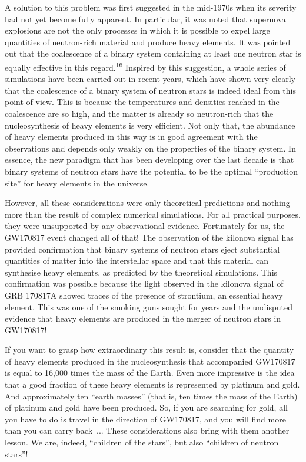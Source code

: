 A solution to this problem was first suggested in the mid-1970s when its severity had
not yet become fully apparent. In particular, it was noted that supernova explosions are
not the only processes in which it is possible to expel large quantities of neutron-rich
material and produce heavy elements. It was pointed out that the coalescence of a binary
system containing at least one neutron star is equally effective in this
regard.\textsuperscript{\hyperlink{note:08-16}{16}} Inspired by this suggestion, a whole series of simulations
have been carried out in recent years, which have shown very clearly that the
coalescence of a binary system of neutron stars is indeed ideal from this point of view.
This is because the temperatures and densities reached in the coalescence are so high,
and the matter is already so neutron-rich that the nucleosynthesis of heavy elements is
very efficient. Not only that, the abundance of heavy elements produced in this way is
in good agreement with the observations and depends only weakly on the properties of the
binary system. In essence, the new paradigm that has been developing over the last
decade is that binary systems of neutron stars have the potential to be the optimal
``production site'' for heavy elements in the universe.

However, all these considerations were only theoretical predictions and nothing more
than the result of complex numerical simulations. For all practical purposes, they were
unsupported by any observational evidence. Fortunately for us, the
GW170817 event changed all of that! The observation of the
kilonova signal has provided confirmation that binary systems of
neutron stars eject substantial quantities of matter into the interstellar space and
that this material can synthesise heavy elements, as predicted by the theoretical
simulations. This confirmation was possible because the light observed in the
kilonova signal of GRB 170817A showed traces of
the presence of strontium, an essential heavy element. This was one
of the smoking guns sought for years and the undisputed evidence that heavy elements are
produced in the merger of neutron stars in GW170817!

If you want to grasp how extraordinary this result is, consider that the quantity of
heavy elements produced in the nucleosynthesis that accompanied
GW170817 is equal to 16,000 times the mass of the Earth. Even more
impressive is the idea that a good fraction of these heavy elements is represented by
platinum and gold. And approximately ten ``earth
masses'' (that is, ten times the mass of the Earth) of platinum and gold have been
produced. So, if you are searching for gold, all you have to do is travel in the
direction of GW170817, and you will find more than you can carry back~... These
considerations also bring with them another lesson. We are, indeed, ``children of the
stars'', but also ``children of neutron stars''!


